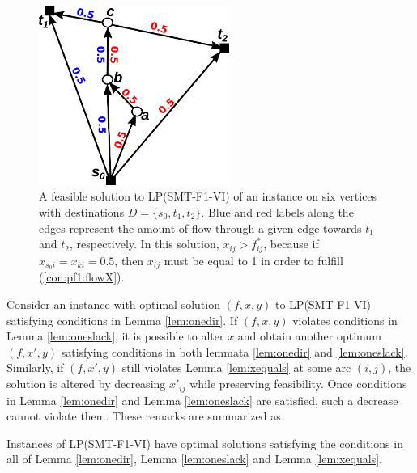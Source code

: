 \begin{figure}[h!]
        \centering
        \includegraphics[height=2.3in]{counterex}
        \caption{A feasible solution to LP(SMT-F1-VI) of an instance on six vertices with destinations $D=\{s_0,t_1,t_2\}$. Blue and red labels along the edges represent the amount of flow through a given edge towards $t_1$ and $t_2$, respectively. In this solution, $x_{ij}>f^*_{ij}$, because if $x_{s_0i}=x_{ki}=0.5$, then $x_{ij}$ must be equal to 1 in order to fulfill (\ref{con:pf1:flowX}).}
                \label{fig:counterex}
\end{figure}
 
Consider an instance with optimal solution $(f,x,y)$ to LP(SMT-F1-VI) satisfying conditions in Lemma \ref{lem:onedir}. If $(f,x,y)$ violates conditions in Lemma \ref{lem:oneslack}, it is possible to alter $x$ and obtain another optimum $(f,x',y)$ satisfying conditions in both lemmata \ref{lem:onedir} and \ref{lem:oneslack}. Similarly, if $(f,x',y)$ still violates Lemma \ref{lem:xequals} at some arc $(i,j)$, the solution is altered by decreasing $x'_{ij}$ while preserving feasibility. Once conditions in Lemma \ref{lem:onedir} and Lemma \ref{lem:oneslack} are satisfied, such a decrease cannot violate them. These remarks are summarized as 
\begin{obs}
Instances of LP(SMT-F1-VI) have optimal solutions satisfying the conditions in all of Lemma \ref{lem:onedir}, Lemma \ref{lem:oneslack} and Lemma \ref{lem:xequals}.
\end{obs}


